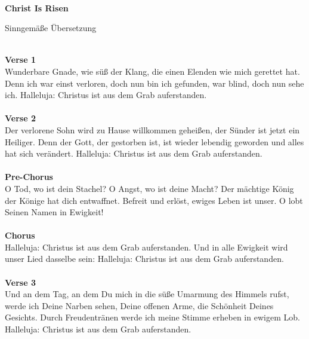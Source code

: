 \mbox{}\\
\huge\centerline{\textbf{Christ Is Risen}}
\normalsize \centerline{Sinngemäße Übersetzung}
\mbox{}\\
\textbf{Verse 1}\\
Wunderbare Gnade, wie süß der Klang, die einen Elenden wie mich gerettet hat.
Denn ich war einst verloren, doch nun bin ich gefunden, war blind, doch nun sehe ich.
Halleluja: Christus ist aus dem Grab auferstanden.\\
\\
\textbf{Verse 2}\\
Der verlorene Sohn wird zu Hause willkommen geheißen, der Sünder ist jetzt ein Heiliger.
Denn der Gott, der gestorben ist, ist wieder lebendig geworden und alles hat sich verändert.
Halleluja: Christus ist aus dem Grab auferstanden.\\
\\
\textbf{Pre-Chorus}\\
O Tod, wo ist dein Stachel? O Angst, wo ist deine Macht?
Der mächtige König der Könige hat dich entwaffnet.
Befreit und erlöst, ewiges Leben ist unser.
O lobt Seinen Namen in Ewigkeit!\\
\\
\textbf{Chorus}\\
Halleluja: Christus ist aus dem Grab auferstanden.
Und in alle Ewigkeit wird unser Lied dasselbe sein:
Halleluja: Christus ist aus dem Grab auferstanden.\\
\\
\textbf{Verse 3}\\
Und an dem Tag, an dem Du mich in die süße Umarmung des Himmels rufst, 
werde ich Deine Narben sehen, Deine offenen Arme, die Schönheit Deines Gesichts.
Durch Freudentränen werde ich meine Stimme erheben in ewigem Lob.
Halleluja: Christus ist aus dem Grab auferstanden.
